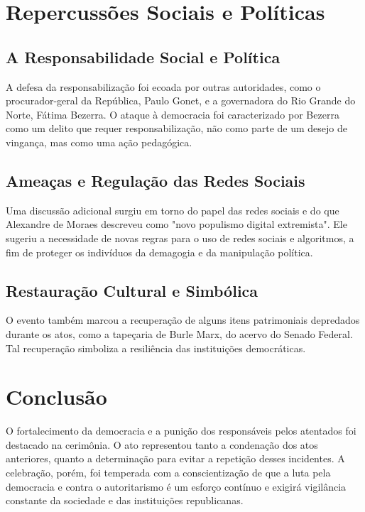 \documentclass[
   article,       
   12pt,          
   oneside,       
   a4paper,       
   english,       
   brazil,        
   sumario=tradicional
   ]{abntex2}
\begin{document}
\section{Repercussões Sociais e Políticas}

\subsection{A Responsabilidade Social e Política}
A defesa da responsabilização foi ecoada por outras autoridades, como o procurador-geral da República, Paulo Gonet, e a governadora do Rio Grande do Norte, Fátima Bezerra. O ataque à democracia foi caracterizado por Bezerra como um delito que requer responsabilização, não como parte de um desejo de vingança, mas como uma ação pedagógica.

\subsection{Ameaças e Regulação das Redes Sociais}
Uma discussão adicional surgiu em torno do papel das redes sociais e do que Alexandre de Moraes descreveu como "novo populismo digital extremista". Ele sugeriu a necessidade de novas regras para o uso de redes sociais e algoritmos, a fim de proteger os indivíduos da demagogia e da manipulação política.

\subsection{Restauração Cultural e Simbólica}
O evento também marcou a recuperação de alguns itens patrimoniais depredados durante os atos, como a tapeçaria de Burle Marx, do acervo do Senado Federal. Tal recuperação simboliza a resiliência das instituições democráticas.
\section{Conclusão}
O fortalecimento da democracia e a punição dos responsáveis pelos atentados foi destacado na cerimônia. O ato representou tanto a condenação dos atos anteriores, quanto a determinação para evitar a repetição desses incidentes. A celebração, porém, foi temperada com a conscientização de que a luta pela democracia e contra o autoritarismo é um esforço contínuo e exigirá vigilância constante da sociedade e das instituições republicanas.

\postextual

\end{document}
